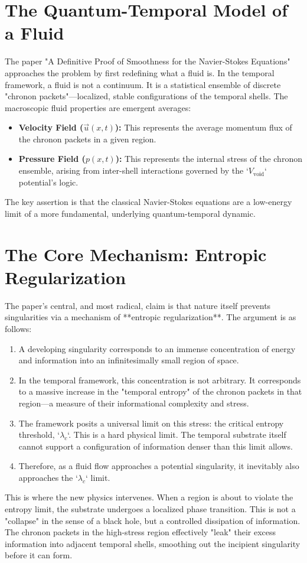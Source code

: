 \documentclass[12pt]{report}
\begin{document}
\section{The Quantum-Temporal Model of a Fluid}
The paper "A Definitive Proof of Smoothness for the Navier-Stokes Equations" approaches the problem by first redefining what a fluid is. In the temporal framework, a fluid is not a continuum. It is a statistical ensemble of discrete "chronon packets"—localized, stable configurations of the temporal shells. The macroscopic fluid properties are emergent averages:
\begin{itemize}
    \item \textbf{Velocity Field ($\vec{u}(x,t)$):} This represents the average momentum flux of the chronon packets in a given region.
    \item \textbf{Pressure Field ($p(x,t)$):} This represents the internal stress of the chronon ensemble, arising from inter-shell interactions governed by the `$V_{\text{void}}$` potential's logic.
\end{itemize}
The key assertion is that the classical Navier-Stokes equations are a low-energy limit of a more fundamental, underlying quantum-temporal dynamic.

\section{The Core Mechanism: Entropic Regularization}
The paper's central, and most radical, claim is that nature itself prevents singularities via a mechanism of **entropic regularization**. The argument is as follows:
\begin{enumerate}
    \item A developing singularity corresponds to an immense concentration of energy and information into an infinitesimally small region of space.
    \item In the temporal framework, this concentration is not arbitrary. It corresponds to a massive increase in the "temporal entropy" of the chronon packets in that region—a measure of their informational complexity and stress.
    \item The framework posits a universal limit on this stress: the critical entropy threshold, `$\lambda_c$`. This is a hard physical limit. The temporal substrate itself cannot support a configuration of information denser than this limit allows.
    \item Therefore, as a fluid flow approaches a potential singularity, it inevitably also approaches the `$\lambda_c$` limit.
\end{enumerate}
This is where the new physics intervenes. When a region is about to violate the entropy limit, the substrate undergoes a localized phase transition. This is not a "collapse" in the sense of a black hole, but a controlled dissipation of information. The chronon packets in the high-stress region effectively "leak" their excess information into adjacent temporal shells, smoothing out the incipient singularity before it can form.
\end{document}
